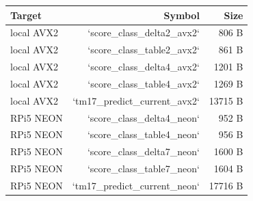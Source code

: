 \begin{tabular}{lrr}
\toprule
Target & Symbol & Size \\
\midrule
local AVX2 & `score\_class\_delta2\_avx2` & 806 B \\
local AVX2 & `score\_class\_table2\_avx2` & 861 B \\
local AVX2 & `score\_class\_delta4\_avx2` & 1201 B \\
local AVX2 & `score\_class\_table4\_avx2` & 1269 B \\
local AVX2 & `tm17\_predict\_current\_avx2` & 13715 B \\
RPi5 NEON & `score\_class\_delta4\_neon` & 952 B \\
RPi5 NEON & `score\_class\_table4\_neon` & 956 B \\
RPi5 NEON & `score\_class\_delta7\_neon` & 1600 B \\
RPi5 NEON & `score\_class\_table7\_neon` & 1604 B \\
RPi5 NEON & `tm17\_predict\_current\_neon` & 17716 B \\
\bottomrule
\end{tabular}

